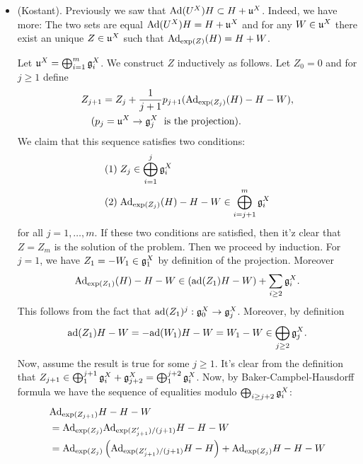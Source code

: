\begin{itemize}
    \item (Kostant). Previously we saw that $\text{Ad}(U^X)H\subset H+\mathfrak{u}^X$. Indeed, we have more: The two 
    sets are equal $\text{Ad}(U^X)H= H+\mathfrak{u}^X$ and for any $W\in\mathfrak{u}^X$ there exist an unique $Z\in\mathfrak{u}^X$ such that 
    $\text{Ad}_{\exp(Z)}(H)=H+W$.\par 
    Let $\mathfrak{u}^X=\bigoplus_{i=1}^m\mathfrak{g}_i^X$. We construct $Z$ inductively as follows. 
    Let $Z_0=0$ and for $j\geq1$ define 
    \begin{equation}
        \begin{split}
            &Z_{j+1}=Z_j+\frac{1}{j+1}p_{j+1}(\text{Ad}_{\exp(Z_j)}(H)-H-W),\\
            &\quad(p_j=\mathfrak{u}^X\to\mathfrak{g}_j^X\;\text{ is the projection}).
        \end{split}
    \end{equation}
    We claim that this sequence satisfies two conditions:
    \begin{equation}
        \begin{split}
            &(1)\; Z_j\in\bigoplus_{i=1}^j\mathfrak{g}_i^X\\
            &(2)\;\text{Ad}_{\exp(Z_j)}(H)-H-W\in\bigoplus_{i=j+1}^m\mathfrak{g}_i^X
        \end{split}
    \end{equation}
    for all $j=1,\dots, m$. 
    If these two conditions are satisfied, then it'z clear that $Z=Z_m$ is the solution of the problem.
    Then we proceed by induction. For $j=1$, we have $Z_1=-W_1\in\mathfrak{g}_1^X$ by definition of the projection. Moreover
    \begin{equation}
        \text{Ad}_{\exp(Z_1)}(H)-H-W\in (\text{ad}(Z_1)H-W)+\sum_{i\geq2}\mathfrak{g}_i^X.
    \end{equation}
    This follows from the fact that $\text{ad}(Z_1)^j:\mathfrak{g}_0^X\to\mathfrak{g}_j^X$. Moreover, by definition
    \begin{equation}
        \text{ad}(Z_1)H-W=-\text{ad}(W_1)H-W=W_1-W\in\bigoplus_{j\geq2}\mathfrak{g}_j^X.
    \end{equation}
    Now, assume the result is true for some $j\geq1$. It's clear from the definition that 
    $Z_{j+1}\in \bigoplus_{1}^{j+1}\mathfrak{g}_i^X+\mathfrak{g}_{j+2}^X=\bigoplus_{1}^{j+2}\mathfrak{g}_i^X$. Now, by 
    Baker-Campbel-Hausdorff formula we have the sequence of equalities modulo $\bigoplus_{i\geq j+2}\mathfrak{g}_i^X$:
    \begin{equation}
        \begin{split}
            &\text{Ad}_{\exp(Z_{j+1})}H-H-W\\
            &=\text{Ad}_{\exp(Z_j)}\text{Ad}_{\exp(Z_{j+1}^\prime)/(j+1)}H-H-W\\
            &=\text{Ad}_{\exp(Z_j)}\left(\text{Ad}_{\exp(Z_{j+1}^\prime)/(j+1)}H-H\right)+\text{Ad}_{\exp(Z_j)}H-H-W
        \end{split}
    \end{equation}


\end{itemize}
